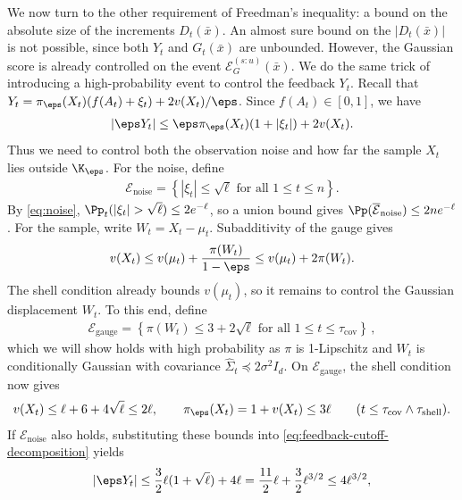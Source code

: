 We now turn to the other requirement of Freedman's inequality:
a bound on the absolute size of the increments $D_t(\bar{x})$.
An almost sure bound on the $|D_t(\bar{x})|$ is not possible, since both $Y_t$ and $G_t(\bar{x})$ are unbounded.
However, the Gaussian score is already controlled on the event $\mathcal E_G^{(s:u)}(\bar{x})$.
We do the same trick of introducing a high-probability event to control the feedback $Y_t$.
Recall that
$Y_t=\pi_\eps(X_t)(f(A_t)+\xi_t)+2v(X_t)/\eps$. Since
$f(A_t)\in[0,1]$, we have
\begin{align}
    |\eps Y_t|
    \leq\eps\pi_\eps(X_t)(1+|\xi_t|)+2v(X_t).
    \label{eq:feedback-cutoff-decomposition}
\end{align}
Thus we need to control both the observation noise and how far the sample
$X_t$ lies outside $\K_\eps$.
For the noise, define
\begin{align}
    \mathcal E_{\mathrm{noise}}
    =\left\{|\xi_t|\leq\sqrt\ell
    \text{ for all }1\leq t\leq n\right\}.
    \label{eq:noise-cutoff-event}
\end{align}
By \eqref{eq:noise}, $\Pp_t(|\xi_t|>\sqrt\ell)\leq2e^{-\ell}$,
so a union bound gives $\Pp(\overline{\mathcal E}_{\mathrm{noise}})\leq2ne^{-\ell}$.
For the sample, write $W_t=X_t-\mu_t$. Subadditivity of the gauge gives
\begin{align}
    v(X_t)\leq v(\mu_t)+\frac{\pi(W_t)}{1-\eps}
    \leq v(\mu_t)+2\pi(W_t).
\end{align}
The shell condition already bounds $v(\mu_t)$, so it remains to control
the Gaussian displacement $W_t$.
To this end, define
\begin{align}
    \mathcal E_{\mathrm{gauge}}
    =\left\{\pi(W_t)\leq3+2\sqrt\ell
    \text{ for all }1\leq t\leq\tau_{\mathrm{cov}}\right\}\,,
    \label{eq:gauge-cutoff-event}
\end{align}
which we will show holds with high probability as $\pi$ is 1-Lipschitz and $W_t$ is conditionally Gaussian
with covariance $\widehat\Sigma_t\preceq2\sigma^2I_d$.
On $\mathcal E_{\mathrm{gauge}}$, the shell condition now gives
\begin{align}
    v(X_t)\leq\ell+6+4\sqrt\ell\leq2\ell,
    \qquad\pi_\eps(X_t)=1+v(X_t)\leq3\ell
    \qquad(t\leq\tau_{\mathrm{cov}}\wedge\tau_{\mathrm{shell}}).
\end{align}
If $\mathcal E_{\mathrm{noise}}$ also holds, substituting these bounds
into \eqref{eq:feedback-cutoff-decomposition} yields
\begin{align}
    |\eps Y_t|
    \leq\frac32\ell(1+\sqrt\ell)+4\ell
    =\frac{11}{2}\ell+\frac32\ell^{3/2}
    \leq4\ell^{3/2},
    \label{eq:feedback-cutoff-bound}
\end{align}

